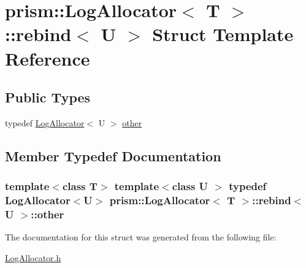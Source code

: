 \hypertarget{structprism_1_1_log_allocator_1_1rebind}{}\section{prism\+:\+:Log\+Allocator$<$ T $>$\+:\+:rebind$<$ U $>$ Struct Template Reference}
\label{structprism_1_1_log_allocator_1_1rebind}
\subsection*{Public Types}
\begin{DoxyCompactItemize}
\item 
typedef \hyperlink{classprism_1_1_log_allocator}{Log\+Allocator}$<$ U $>$ \hyperlink{structprism_1_1_log_allocator_1_1rebind_a72f405cf30fe3b5bd36da818f4e532c8}{other}
\end{DoxyCompactItemize}


\subsection{Member Typedef Documentation}
\subsubsection[{\texorpdfstring{other}{other}}]{\setlength{\rightskip}{0pt plus 5cm}template$<$class T$>$ template$<$class U $>$ typedef {\bf Log\+Allocator}$<$U$>$ {\bf prism\+::\+Log\+Allocator}$<$ T $>$\+::{\bf rebind}$<$ U $>$\+::{\bf other}}\hypertarget{structprism_1_1_log_allocator_1_1rebind_a72f405cf30fe3b5bd36da818f4e532c8}{}\label{structprism_1_1_log_allocator_1_1rebind_a72f405cf30fe3b5bd36da818f4e532c8}


The documentation for this struct was generated from the following file\+:\begin{DoxyCompactItemize}
\item 
\hyperlink{_log_allocator_8h}{Log\+Allocator.\+h}\end{DoxyCompactItemize}

